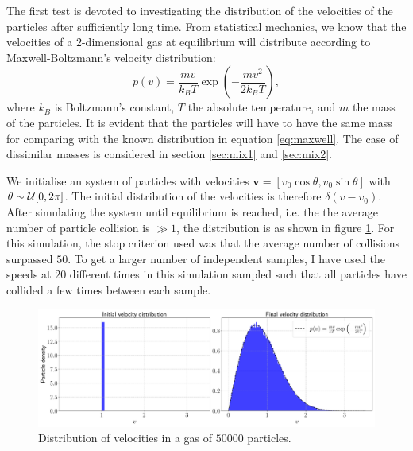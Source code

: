 The first test is devoted to investigating the distribution of the velocities of the particles after sufficiently long time. From statistical mechanics, we know that the velocities of a $2$-dimensional gas at equilibrium will distribute according to Maxwell-Boltzmann's velocity distribution: 
\begin{equation}\label{eq:maxwell}
	p(v) = \frac{mv}{k_B T} \exp{\left(- \frac{mv^2}{2 k_B T}\right)},
\end{equation}
where $k_B$ is Boltzmann's constant, $T$ the absolute temperature, and $m$ the mass of the particles. It is evident that the particles will have to have the same mass for comparing with the known distribution in equation \ref{eq:maxwell}. The case of dissimilar masses is considered in section \ref{sec:mix1} and \ref{sec:mix2}.

We initialise an system of particles with velocities $\mathbf{v} = [v_0 \cos{\theta} , v_0 \sin{\theta}]$ with $\theta \sim \mathcal{U}[0,2\pi]$. The initial distribution of the velocities is therefore $\delta (v - v_0)$. After simulating the system until equilibrium is reached, i.e. the the average number of particle collision is $\gg 1$, the distribution is as shown in figure \ref{fig:dist_1}. For this simulation, the stop criterion used was that the average number of collisions surpassed $50$. To get a larger number of independent samples, I have used the speeds at $20$ different times in this simulation sampled such that all particles have collided a few times between each sample. 

\begin{figure}[htb]
	\centering
	\includegraphics[width=\textwidth]{../fig/distribution}
	\caption{Distribution of velocities in a gas of $50000$ particles.}
	\label{fig:dist_1}
\end{figure}

%

